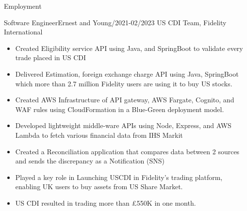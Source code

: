 \documentclass[]{mcdowellcv}
\begin{document}
\begin{cvsection}{Employment}
        \begin{cvsubsection}{Software Engineer}{Ernest and Young}{/2021-02/2023}
            US CDI Team,    Fidelity International
            \begin{itemize}
                \item Created Eligibility service API using Java, and SpringBoot to validate every trade placed in US CDI
                \item Delivered Estimation, foreign exchange charge API using Java, SpringBoot which more than 2.7 million
                Fidelity users are using it to buy US stocks.
                \item Created AWS Infrastructure of API gateway, AWS Fargate, Cognito, and WAF rules using CloudFormation in a Blue-Green deployment model.
                \item Developed lightweight middle-ware APIs using Node, Express, and AWS Lambda to fetch various financial data from IHS Markit
                \item Created a Reconciliation application that compares data between 2 sources and sends the discrepancy as a
                Notification (SNS)
                \item Played a key role in Launching USCDI in Fidelity's trading platform, enabling UK users to buy assets from US Share Market.
                \item US CDI resulted in trading more than £550K in one month.
            \end{itemize}
        \end{cvsubsection}
%

\end{cvsection}
\end{document}
